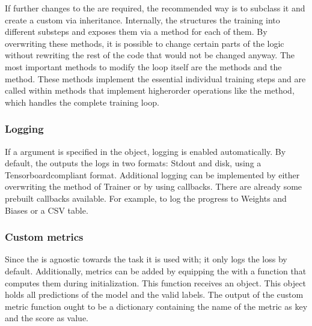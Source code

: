 \documentclass[letterpaper,10pt,english]{jupyterBook}
\begin{document}
\sphinxAtStartPar
If further changes to the  are required, the recommended way is to subclass it and create a custom via inheritance.
Internally, the  structures the training into different sub\sphinxhyphen{}steps and exposes them via a method for each of them.
By overwriting these methods, it is possible to change certain parts of the logic without rewriting the rest of the code that would not be changed anyway.
The most important methods to modify the \sphinxhyphen{}loop itself are the  methods and the  method.
These methods implement the essential individual training steps and are called within methods that implement higher\sphinxhyphen{}order operations like the \sphinxhyphen{}method, which handles the complete training loop.


\subsubsection{Logging}
\label{\detokenize{HuggingFaceTrainer:logging}}
\sphinxAtStartPar
If a \sphinxhyphen{}argument is specified in the \sphinxhyphen{}object, logging is enabled automatically.
By default, the  outputs the logs in two formats: Stdout and disk, using a Tensorboard\sphinxhyphen{}compliant format.
Additional logging can be implemented by either overwriting the \sphinxhyphen{}method of Trainer or by using callbacks.
There are already some pre\sphinxhyphen{}built callbacks available. For example, to log the progress to Weights and Biases or a CSV table.


\subsubsection{Custom metrics}
\label{\detokenize{HuggingFaceTrainer:custom-metrics}}
\sphinxAtStartPar
Since the  is agnostic towards the task it is used with; it only logs the loss by default.
Additionally, metrics can be added by equipping the  with a function that computes them during initialization.
This function receives an  object.
This object holds all predictions of the model and the valid labels.
The output of the custom metric function ought to be a dictionary containing the name of the metric as key and the score as value.
\end{document}
